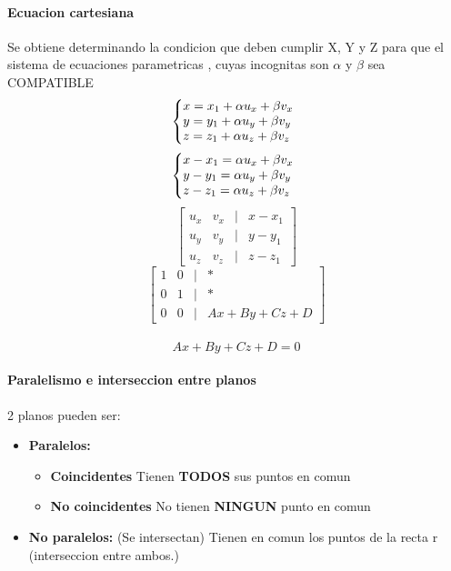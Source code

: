 \documentclass[11pt]{article}
\begin{document}
\paragraph{Ecuacion cartesiana}
Se obtiene determinando la condicion que deben cumplir  X, Y y Z para que el sistema
de ecuaciones parametricas , cuyas incognitas son $\alpha$ y $\beta$ sea COMPATIBLE
\begin{equation*}
  \left\{
    \begin{array}{@{} l c @{}}
    x = x_1 + \alpha u_x + \beta v_x \\
    y = y_1 + \alpha u_y + \beta v_y\\
    z = z_1 + \alpha u_z + \beta v_z
    \end{array}\right.
\end{equation*}
\begin{equation*}
  \left\{
    \begin{array}{@{} l c @{}}
    x - x_1 = \alpha u_x + \beta v_x \\
    y - y_1 = \alpha u_y + \beta v_y\\
    z - z_1 = \alpha u_z + \beta v_z
    \end{array}\right.
\end{equation*}
\begin{equation*}
\begin{bmatrix}
	{u_x} & {v_x} & {\vert} &  {x - x_1}\\
	{u_y} & {v_y} & {\vert} &  {y - y_1}\\
	{u_z} & {v_z} & {\vert} &  {z - z_1}
\end{bmatrix}
\end{equation*}
\begin{equation*}
\begin{bmatrix}
	{1} & {0} & {\vert} &  {*}\\
	{0} & {1} & {\vert} &  {*}\\
	{0} & {0} & {\vert} &  {Ax + By + Cz + D}
\end{bmatrix}
\end{equation*}\\
\begin{equation*}
	Ax + By + Cz + D = 0
\end{equation*}
\paragraph{Paralelismo e interseccion entre planos}
2 planos pueden ser:
\begin{itemize}
	\item \textbf{Paralelos:}
	\begin{itemize}
		\item \textbf{Coincidentes} Tienen \textbf{TODOS} sus puntos en comun
		\item \textbf{No coincidentes} No tienen \textbf{NINGUN} punto en comun	
	\end{itemize}
	\item \textbf{No paralelos: } (Se intersectan) Tienen en comun los puntos de la recta r
		(interseccion entre ambos.)
\end{itemize}
\end{document}
